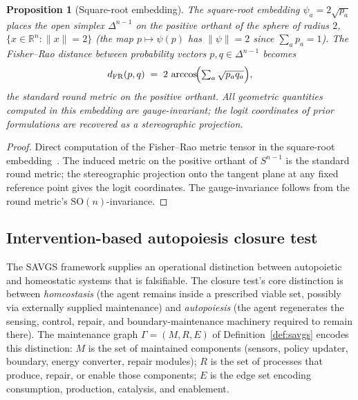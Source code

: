\documentclass[11pt,a4paper]{article}
\theoremstyle{plain}
\newtheorem{proposition}[theorem]{Proposition}
\theoremstyle{definition}
\theoremstyle{remark}
\newcommand{\RR}{\mathbb{R}}
\newcommand{\SO}{\mathrm{SO}}
\begin{document}
\begin{proposition}[Square-root embedding]\label{prop:sqrt}
The square-root embedding $\psi_a = 2\sqrt{p_a}$ places the open simplex
$\Delta^{n-1}$ on the positive orthant of the sphere of radius
$2$, $\{x\in\RR^n : \|x\| = 2\}$ (the map $p \mapsto \psi(p)$ has
$\|\psi\| = 2$ since $\sum_a p_a = 1$). The Fisher--Rao distance between probability
vectors $p,q\in\Delta^{n-1}$ becomes
\begin{equation}\label{eq:fr}
  d_{\mathrm{FR}}(p,q) \;=\; 2\,\arccos\!\Bigl(\textstyle\sum_a\sqrt{p_a q_a}\Bigr),
\end{equation}
the standard round metric on the positive orthant. All geometric
quantities computed in this embedding are gauge-invariant; the logit
coordinates of prior formulations are recovered as a stereographic
projection.
\end{proposition}

\begin{proof}
Direct computation of the Fisher--Rao metric tensor in the square-root
embedding~\cite{bhattacharyya1943,amari2000}. The induced metric on the
positive orthant of $S^{n-1}$ is the standard round metric; the
stereographic projection onto the tangent plane at any fixed reference
point gives the logit coordinates. The gauge-invariance follows from
the round metric's $\SO(n)$-invariance.
\end{proof}

\subsection{Intervention-based autopoiesis closure test}

\label{sec:kappa-closure}
The SAVGS framework supplies an operational distinction between
autopoietic and homeostatic systems that is falsifiable. The closure test's core distinction is between \emph{homeostasis} (the agent remains
inside a prescribed viable set, possibly via externally supplied
maintenance) and \emph{autopoiesis} (the agent regenerates the sensing,
control, repair, and boundary-maintenance machinery required to remain
there). The maintenance graph $\Gamma = (M, R, E)$ of
Definition~\ref{def:savgs} encodes this distinction: $M$ is the set of
maintained components (sensors, policy updater, boundary, energy
converter, repair modules); $R$ is the set of processes that produce,
repair, or enable those components; $E$ is the edge set encoding
consumption, production, catalysis, and enablement.
\end{document}
